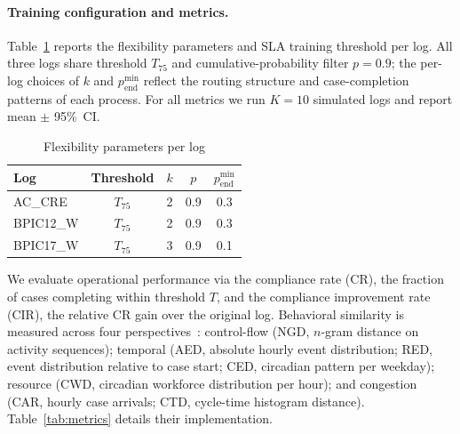\documentclass[journal,onecolumn]{IEEEtran}
\begin{document}
\paragraph{Training configuration and metrics.}
Table~\ref{tab:training} reports the flexibility parameters and SLA
training threshold per log. All three logs share threshold $T_{75}$
and cumulative-probability filter $p=0.9$; the per-log choices of
$k$ and $p_{\mathrm{end}}^{\min}$ reflect the routing structure and
case-completion patterns of each process. For all metrics we run
$K=10$ simulated logs and report mean $\pm$ 95\%~CI.

\begin{table}[!ht]
\centering\small
\setlength{\tabcolsep}{5pt}
\begin{tabular}{lcccc}
\toprule
\textbf{Log} & \textbf{Threshold} & $k$ & $p$ &
$p_{\mathrm{end}}^{\min}$ \\
\midrule
AC\_CRE   & $T_{75}$ & 2 & 0.9 & 0.3 \\
BPIC12\_W & $T_{75}$ & 2 & 0.9 & 0.3 \\
BPIC17\_W & $T_{75}$ & 3 & 0.9 & 0.1 \\
\bottomrule
\end{tabular}
\caption{Flexibility parameters per log}
\label{tab:training}
\end{table}

We evaluate operational performance via the compliance rate (CR),
the fraction of cases completing within threshold $T$, and the
compliance improvement rate (CIR), the relative CR gain over the
original log. Behavioral similarity is measured across four
perspectives~\cite{framework_for_measuring_the_quality_of_business_process_simulation_models}:
control-flow (NGD, $n$-gram distance on activity sequences);
temporal (AED, absolute hourly event distribution; RED, event
distribution relative to case start; CED, circadian pattern per
weekday); resource (CWD, circadian workforce distribution per
hour); and congestion (CAR, hourly case arrivals; CTD, cycle-time
histogram distance). Table~\ref{tab:metrics} details their
implementation.
\end{document}

